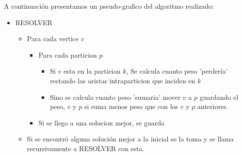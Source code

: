 A continuación presentamos un pseudo-grafico del algoritmo realizado:

\begin{itemize}
\item RESOLVER
	\begin{itemize}
	\item Para cada vertice $v$
		\begin{itemize}
		\item Para cada particion $p$
			\begin{itemize}
			\item Si $v$ esta en la particion $k$, Se calcula cuanto peso 'perdería' restando las aristas intraparticion que inciden en $k$
			\item Sino se calcula cuanto peso 'sumaria' mover $v$ a $p$ guardando el peso, $v$ y $p$ si suma menos peso que con los $v$ y $p$ anteriores.
			\end{itemize}
		\item Si se llego a una solucion mejor, se guarda
		\end{itemize}
	\item Si se encontró alguna solución mejor a la inicial se la toma y se llama recursivamente a RESOLVER con esta.
	\end{itemize}
\end{itemize}




